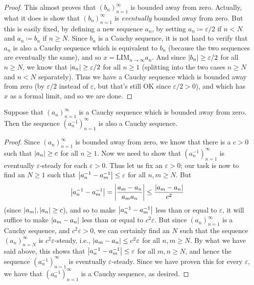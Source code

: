 \begin{proof}
This almost proves that \((b_n)_{n = 1}^{\infty}\) is bounded away from zero.
Actually, what it does is show that \((b_n)_{n = 1}^{\infty}\) is \emph{eventually} bounded away from zero.
But this is easily fixed, by defining a new sequence \(a_n\), by setting \(a_n \coloneqq \varepsilon / 2\) if \(n < N\) and \(a_n \coloneqq b_n\) if \(n \geq N\).
Since \(b_n\) is a Cauchy sequence, it is not hard to verify that \(a_n\) is also a Cauchy sequence which is equivalent to \(b_n\) (because the two sequences are eventually the same), and so \(x = \text{LIM}_{n \to \infty} a_n\).
And since \(\abs*{b_n} \geq \varepsilon / 2\) for all \(n \geq N\), we know that \(\abs*{a_n} \geq \varepsilon / 2\) for all \(n \geq 1\) (splitting into the two cases \(n \geq N\) and \(n < N\) separately).
Thus we have a Cauchy sequence which is bounded away from zero (by \(\varepsilon / 2\) instead of \(\varepsilon\), but that’s still OK since \(\varepsilon / 2 > 0\)), and which has \(x\) as a formal limit, and so we are done.
\end{proof}

\begin{lemma}\label{5.3.15}
Suppose that \((a_n)_{n = 1}^{\infty}\) is a Cauchy sequence which is bounded away from zero.
Then the sequence \((a_n^{-1})_{n = 1}^{\infty}\) is also a Cauchy sequence.
\end{lemma}

\begin{proof}
Since \((a_n)_{n = 1}^{\infty}\) is bounded away from zero, we know that there is a \(c > 0\) such that \(\abs*{a_n} \geq c\) for all \(n \geq 1\).
Now we need to show that \((a_n^{-1})_{n = 1}^{\infty}\) is eventually \(\varepsilon\)-steady for each \(\varepsilon > 0\).
Thus let us fix an \(\varepsilon > 0\);
our task is now to find an \(N \geq 1\) such that \(\abs*{a_n^{-1} - a_m^{-1}} \leq \varepsilon\) for all \(n, m \geq N\).
But
\[
    \abs*{a_n^{-1} - a_m^{-1}} = \abs*{\frac{a_m - a_n}{a_m a_n}} \leq \frac{\abs*{a_m - a_n}}{c^2}
\]
(since \(\abs*{a_m}, \abs*{a_n} \geq c\)), and so to make \(\abs*{a_n^{-1} - a_m^{-1}}\) less than or equal to \(\varepsilon\), it will suffice to make \(\abs*{a_m - a_n}\) less than or equal to \(c^2 \varepsilon\).
But since \((a_n)_{n = 1}^{\infty}\) is a Cauchy sequence, and \(c^2 \varepsilon > 0\), we can certainly find an \(N\) such that the sequence \((a_n)_{n = N}^{\infty}\) is \(c^2 \varepsilon\)-steady, i.e., \(\abs*{a_m - a_n} \leq c^2 \varepsilon\) for all \(n, m \geq N\).
By what we have said above, this shows that \(\abs*{a_n^{-1} - a_m^{-1}} \leq \varepsilon\) for all \(m, n \geq N\), and hence the sequence \((a_n^{-1})_{n = 1}^{\infty}\) is eventually \(\varepsilon\)-steady.
Since we have proven this for every \(\varepsilon\), we have that \((a_n^{-1})_{n = 1}^{\infty}\) is a Cauchy sequence, as desired.
\end{proof}

